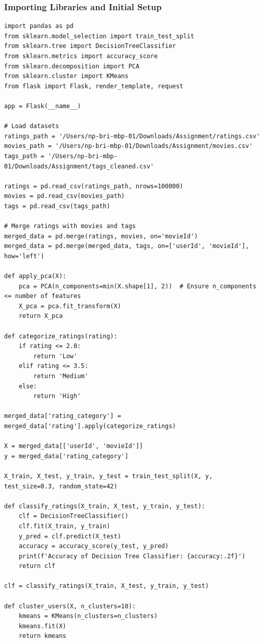 \documentclass[conference]{IEEEtran}
\begin{document}
\subsubsection{Importing Libraries and Initial Setup}
\begin{lstlisting}
import pandas as pd
from sklearn.model_selection import train_test_split
from sklearn.tree import DecisionTreeClassifier
from sklearn.metrics import accuracy_score
from sklearn.decomposition import PCA
from sklearn.cluster import KMeans
from flask import Flask, render_template, request

app = Flask(__name__)

# Load datasets
ratings_path = '/Users/np-bri-mbp-01/Downloads/Assignment/ratings.csv'
movies_path = '/Users/np-bri-mbp-01/Downloads/Assignment/movies.csv'
tags_path = '/Users/np-bri-mbp-01/Downloads/Assignment/tags_cleaned.csv'

ratings = pd.read_csv(ratings_path, nrows=100000)
movies = pd.read_csv(movies_path)
tags = pd.read_csv(tags_path)

# Merge ratings with movies and tags
merged_data = pd.merge(ratings, movies, on='movieId')
merged_data = pd.merge(merged_data, tags, on=['userId', 'movieId'], how='left')

def apply_pca(X):
    pca = PCA(n_components=min(X.shape[1], 2))  # Ensure n_components <= number of features
    X_pca = pca.fit_transform(X)
    return X_pca

def categorize_ratings(rating):
    if rating <= 2.0:
        return 'Low'
    elif rating <= 3.5:
        return 'Medium'
    else:
        return 'High'

merged_data['rating_category'] = merged_data['rating'].apply(categorize_ratings)

X = merged_data[['userId', 'movieId']]
y = merged_data['rating_category']

X_train, X_test, y_train, y_test = train_test_split(X, y, test_size=0.3, random_state=42)

def classify_ratings(X_train, X_test, y_train, y_test):
    clf = DecisionTreeClassifier()
    clf.fit(X_train, y_train)
    y_pred = clf.predict(X_test)
    accuracy = accuracy_score(y_test, y_pred)
    print(f'Accuracy of Decision Tree Classifier: {accuracy:.2f}')
    return clf

clf = classify_ratings(X_train, X_test, y_train, y_test)

def cluster_users(X, n_clusters=10):
    kmeans = KMeans(n_clusters=n_clusters)
    kmeans.fit(X)
    return kmeans


\end{lstlisting}
\end{document}

